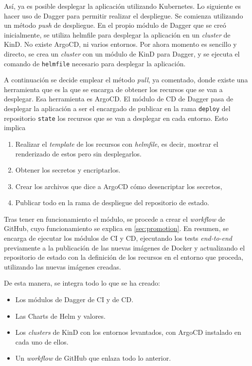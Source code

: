 Así, ya es posible desplegar la aplicación utilizando Kubernetes. Lo siguiente es hacer uso de Dagger para permitir realizar el despliegue. Se comienza utilizando un método \textit{push} de despliegue. En el propio módulo de Dagger que se creó inicialmente, se utiliza helmfile para desplegar la aplicación en un \textit{cluster} de KinD. No existe ArgoCD, ni varios entornos. Por ahora momento es sencillo y directo, se crea un \textit{cluster} con un módulo de KinD para Dagger, y se ejecuta el comando de \texttt{helmfile} necesario para desplegar la aplicación.

A continuación se decide emplear el método \textit{pull}, ya comentado, donde existe una herramienta que es la que se encarga de obtener los recursos que se van a desplegar. Esa herramienta es ArgoCD. El módulo de CD de Dagger pasa de desplegar la aplicación a ser el encargado de publicar en la rama \texttt{deploy} del repositorio \texttt{state} los recursos que se van a desplegar en cada entorno. Esto implica

\begin{enumerate}
  \item Realizar el \textit{template} de los recursos con \textit{helmfile}, es decir, mostrar el renderizado de estos pero sin desplegarlos.
  \item Obtener los secretos y encriptarlos.
  \item Crear los archivos que dice a ArgoCD cómo desencriptar los secretos,
  \item Publicar todo en la rama de despliegue del repositorio de estado.
\end{enumerate}

Tras tener en funcionamiento el módulo, se procede a crear el \textit{workflow} de GitHub, cuyo funcionamiento se explica en \ref{sec:promotion}. En resumen, se encarga de ejecutar los módulos de CI y CD, ejecutando los tests \textit{end-to-end} previamente a la publicación de las nuevas imágenes de Docker y actualizando el repositorio de estado con la definición de los recursos en el entorno que proceda, utilizando las nuevas imágenes creadas.

De esta manera, se integra todo lo que se ha creado:

\begin{itemize}
  \item Los módulos de Dagger de CI y de CD.
  \item Las Charts de Helm y valores.
  \item Los \textit{clusters} de KinD con los entornos levantados, con ArgoCD instalado en cada uno de ellos.
  \item Un \textit{workflow} de GitHub que enlaza todo lo anterior.
\end{itemize}


